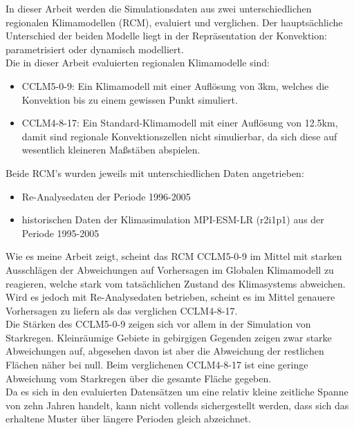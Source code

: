 In dieser Arbeit werden die Simulationsdaten aus zwei unterschiedlichen regionalen Klimamodellen (RCM), evaluiert und verglichen. Der hauptsächliche Unterschied der beiden Modelle liegt in der Repräsentation der Konvektion: parametrisiert oder dynamisch modelliert.\\

Die in dieser Arbeit evaluierten regionalen Klimamodelle sind:
\begin{itemize}
	\item CCLM5-0-9: Ein Klimamodell mit einer Auflösung von 3km, welches die Konvektion bis zu einem gewissen Punkt simuliert.
	\item CCLM4-8-17: Ein Standard-Klimamodell mit einer Auflösung von 12.5km, damit sind regionale Konvektionszellen nicht simulierbar, da sich diese auf wesentlich kleineren Maßstäben abspielen. 
\end{itemize}
Beide RCM's wurden jeweils mit unterschiedlichen Daten angetrieben: 
\begin{itemize}
	\item Re-Analysedaten der Periode 1996-2005
	\item historischen Daten der Klimasimulation MPI-ESM-LR (r2i1p1) \cite{mpi-esm-lr} aus der Periode 1995-2005
\end{itemize}
Wie es meine Arbeit zeigt, scheint das RCM CCLM5-0-9 im Mittel mit starken Ausschlägen der Abweichungen auf Vorhersagen im Globalen Klimamodell zu reagieren, welche stark vom tatsächlichen Zustand des Klimasystems abweichen. Wird es jedoch mit Re-Analysedaten betrieben, scheint es im Mittel genauere Vorhersagen zu liefern als das verglichen CCLM4-8-17.\\
Die Stärken des CCLM5-0-9 zeigen sich vor allem in der Simulation von Starkregen. Kleinräumige Gebiete in gebirgigen Gegenden zeigen zwar starke Abweichungen auf, abgesehen davon ist aber die Abweichung der restlichen Flächen näher bei null. Beim verglichenen CCLM4-8-17 ist eine geringe Abweichung vom Starkregen über die gesamte Fläche gegeben.\\
Da es sich in den evaluierten Datensätzen um eine relativ kleine zeitliche Spanne von zehn Jahren handelt, kann nicht vollends sichergestellt werden, dass sich das erhaltene Muster über längere Perioden gleich abzeichnet.